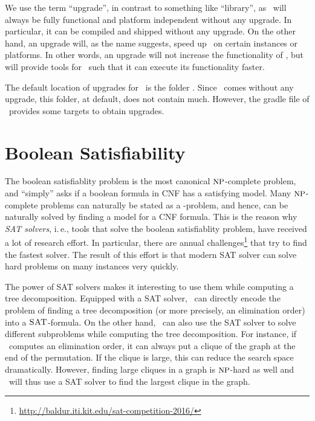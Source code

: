 \documentclass[a4paper, ukenglish, twoside, openright]{jdrasilmanual}
\begin{document}
We use the term ``upgrade'', in contrast to something like
``library'', as \Jdrasil\ will always be fully functional and platform
independent without any upgrade. In particular, it can be compiled and
shipped without any upgrade. On the other hand, an upgrade will, as
the name suggests, speed up \Jdrasil\ on certain instances or
platforms. In other words, an upgrade will not increase the
functionality of \Jdrasil, but will provide tools for \Jdrasil\
such that it can execute its functionality faster.

The default location of upgrades for \Jdrasil\ is the folder
. Since \Jdrasil\ comes
without any upgrade, this folder, at default, does not contain
much. However, the gradle file of \Jdrasil\ provides some targets
to obtain upgrades.
\begin{center}
\vfill
{}
\vfill
\end{center}
\chapter{Boolean Satisfiability}\label{upgrade:sat}
The boolean satisfiablity problem  is the most canonical
$\Class{NP}$-complete problem, and ``simply'' asks if a boolean
formula in CNF has a satisfying model. Many $\Class{NP}$-complete
problems can naturally be stated as a \Lang{SAT}-problem, and hence, can
be naturally solved by finding a model for a CNF formula. This is the
reason why \emph{SAT solvers}, i.\,e., tools that solve the boolean
satisfiablity problem, have received a lot of research effort. In
particular, there are annual challenges\footnote{\url{http://baldur.iti.kit.edu/sat-competition-2016/}} that try to
find the fastest solver. The result of this effort is that modern
SAT solver can solve hard problems on many instances very quickly.

The power of SAT solvers makes it interesting to use them while
computing a tree decomposition. Equipped with a SAT solver, \Jdrasil\
can directly encode the problem of finding a tree decomposition (or
more precisely, an elimination order) into a $\Lang{SAT}$-formula. On the other hand, \Jdrasil\ can
also use the SAT solver to solve different subproblems while computing
the tree decomposition. For instance, if \Jdrasil\ computes an
elimination order, it can always put a clique of the graph at the
end of the permutation. If the clique is large, this can reduce the
search space dramatically. However, finding large cliques in a graph is
$\Class{NP}$-hard as well and \Jdrasil\ will thus use a SAT solver to find the
largest clique in the graph.
\end{document}
